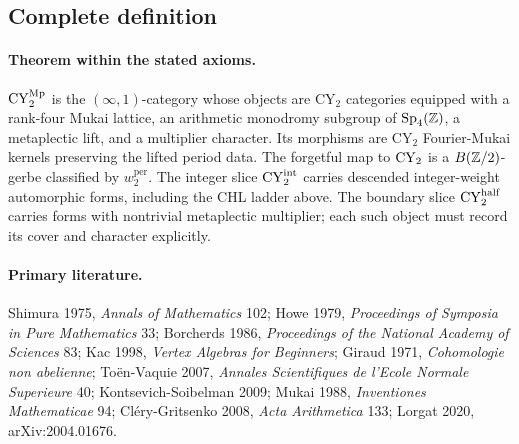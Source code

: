 \subsection*{Complete definition}

\paragraph{Theorem within the stated axioms.}
\(\mathrm{CY}_2^{\mathrm{Mp}}\) is the \((\infty,1)\)-category whose objects are CY\(_2\)
categories equipped with a rank-four Mukai lattice, an arithmetic
monodromy subgroup of \(\mathrm{Sp}_4(\mathbb{Z})\), a metaplectic lift, and a multiplier
character.  Its morphisms are CY\(_2\) Fourier-Mukai kernels preserving
the lifted period data.  The forgetful map to \(\mathrm{CY}_2\) is a
\(B(\mathbb{Z}/2)\)-gerbe classified by \(w_2^{\mathrm{per}}\).  The integer
slice \(\mathrm{CY}_2^{\mathrm{int}}\) carries descended integer-weight automorphic forms,
including the CHL ladder above.  The boundary slice \(\mathrm{CY}_2^{\mathrm{half}}\) carries
forms with nontrivial metaplectic multiplier; each such object must
record its cover and character explicitly.

\paragraph{Primary literature.}
Shimura 1975, \emph{Annals of Mathematics} 102; Howe 1979,
\emph{Proceedings of Symposia in Pure Mathematics} 33; Borcherds 1986,
\emph{Proceedings of the National Academy of Sciences} 83; Kac 1998,
\emph{Vertex Algebras for Beginners}; Giraud 1971,
\emph{Cohomologie non abelienne}; To\"en-Vaquie 2007,
\emph{Annales Scientifiques de l'Ecole Normale Superieure} 40;
Kontsevich-Soibelman 2009; Mukai 1988, \emph{Inventiones Mathematicae}
94; Cl\'ery-Gritsenko 2008, \emph{Acta Arithmetica} 133; Lorgat 2020,
arXiv:2004.01676.
